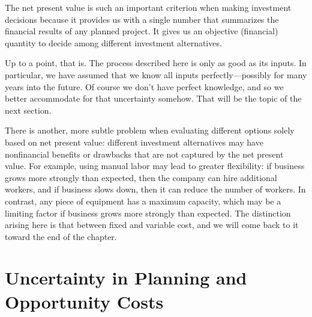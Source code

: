 The net present value is such an important criterion when making
investment decisions because it provides us with a single number that
summarizes the financial results of any planned project. It gives us
an objective (financial) quantity to decide among different investment
alternatives.
    
Up to a point, that is. The process described here is only as good as
its inputs. In particular, we have assumed that we know all inputs
perfectly---possibly for many years into the future.  Of course we
don't have perfect knowledge, and so we better accommodate for that
uncertainty somehow. That will be the topic of the next section.
    
There is another, more subtle problem when evaluating different
options solely based on net present value: different investment
alternatives may have nonfinancial benefits or drawbacks that are not
captured by the net present value.  For example, using manual labor
may lead to greater flexibility: if business grows more strongly than
expected, then the company can hire additional workers, and if
business slows down, then it can reduce the number of workers. In
contrast, any piece of equipment has a maximum capacity, which may be
a limiting factor if business grows more strongly than expected. The
distinction arising here is that between fixed and variable cost, and
we will come back to it toward the end of the chapter.


\vspace*{-9pt}
\section{Uncertainty in Planning and Opportunity Costs}

     
